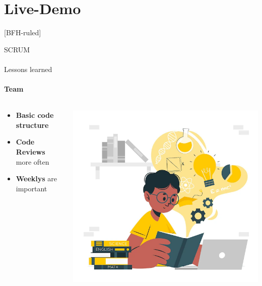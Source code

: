 \documentclass[
    ngerman,%
    authorontitle=true,
]{bfhbeamer}
\begin{document}
	\section{Live-Demo}
	[BFH-ruled]
	\frame{\sectionpage}

	\begin{frame}{SCRUM}
		\framesubtitle{}
	\end{frame}


    \begin{frame}{Lessons learned}
        \framesubtitle{Team}
        \begin{columns} %
            \begin{column}{0.5\textwidth} %
                \begin{itemize}
                    \item \textbf{Basic code structure}
                    \item \textbf{Code Reviews} more often 
                    \item \textbf{Weeklys} are important
                \end{itemize}
            \end{column}
            \begin{column}{0.3\textwidth} %
                \begin{center}
                    \includegraphics[width=1\textwidth]{pictures/Learnings}
                \end{center}
            \end{column}
        \end{columns}
    \end{frame}
\end{document}
